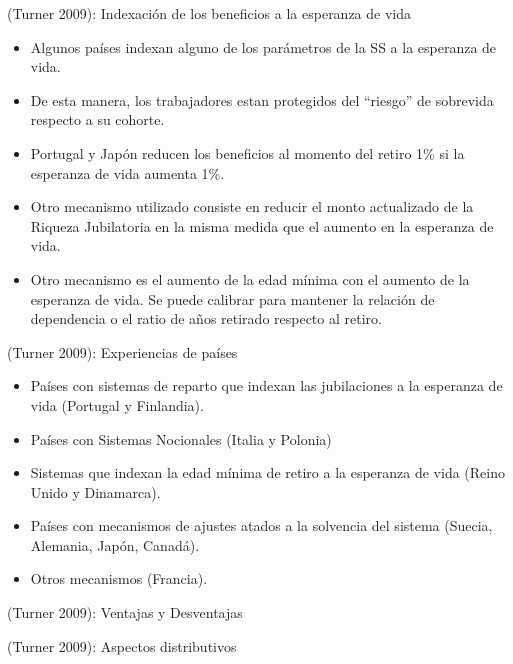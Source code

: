 \documentclass[ignorenonframetext,]{beamer}
\providecommand{\tightlist}{%
  \setlength{\itemsep}{0pt}\setlength{\parskip}{0pt}}
\begin{document}
\begin{frame}{(Turner 2009): Indexación de los beneficios a la esperanza
de vida}

\begin{itemize}
\tightlist
\item
  Algunos países indexan alguno de los parámetros de la SS a la
  esperanza de vida.
\item
  De esta manera, los trabajadores estan protegidos del ``riesgo'' de
  sobrevida respecto a su cohorte.
\item
  Portugal y Japón reducen los beneficios al momento del retiro 1\% si
  la esperanza de vida aumenta 1\%.
\item
  Otro mecanismo utilizado consiste en reducir el monto actualizado de
  la Riqueza Jubilatoria en la misma medida que el aumento en la
  esperanza de vida.
\item
  Otro mecanismo es el aumento de la edad mínima con el aumento de la
  esperanza de vida. Se puede calibrar para mantener la relación de
  dependencia o el ratio de años retirado respecto al retiro.
\end{itemize}

\end{frame}

\begin{frame}{(Turner 2009): Experiencias de países}

\begin{itemize}
\tightlist
\item
  Países con sistemas de reparto que indexan las jubilaciones a la
  esperanza de vida (Portugal y Finlandia).
\item
  Países con Sistemas Nocionales (Italia y Polonia)
\item
  Sistemas que indexan la edad mínima de retiro a la esperanza de vida
  (Reino Unido y Dinamarca).
\item
  Países con mecanismos de ajustes atados a la solvencia del sistema
  (Suecia, Alemania, Japón, Canadá).
\item
  Otros mecanismos (Francia).
\end{itemize}

\end{frame}

\begin{frame}{(Turner 2009): Ventajas y Desventajas}

\end{frame}

\begin{frame}{(Turner 2009): Aspectos distributivos}

\end{frame}
\end{document}
